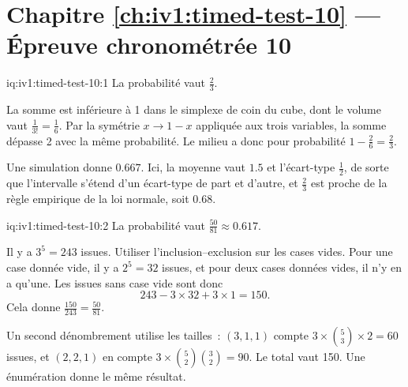 \section*{Chapitre \ref{ch:iv1:timed-test-10} --- Épreuve chronométrée 10}

\begin{solution}{iq:iv1:timed-test-10:1}
La probabilité vaut $\frac23$.

La somme est inférieure à 1 dans le simplexe de coin du cube, dont le volume vaut $\frac{1}{3!} = \frac16$. Par la symétrie $x \to 1 - x$ appliquée aux trois variables, la somme dépasse 2 avec la même probabilité. Le milieu a donc pour probabilité $1 - \frac26 = \frac23$.

Une simulation donne $0.667$. Ici, la moyenne vaut $1.5$ et l'écart-type $\frac12$, de sorte que l'intervalle s'étend d'un écart-type de part et d'autre, et $\frac23$ est proche de la règle empirique de la loi normale, soit $0.68$.

\end{solution}

\begin{solution}{iq:iv1:timed-test-10:2}
La probabilité vaut $\frac{50}{81} \approx 0.617$.

Il y a $3^5 = 243$ issues. Utiliser l'inclusion--exclusion sur les cases vides. Pour une case donnée vide, il y a $2^5 = 32$ issues, et pour deux cases données vides, il n'y en a qu'une. Les issues sans case vide sont donc
\[
243 - 3 \times 32 + 3 \times 1 = 150.
\]
Cela donne $\frac{150}{243} = \frac{50}{81}$.

Un second dénombrement utilise les tailles~: $(3, 1, 1)$ compte $3 \times \binom53 \times 2 = 60$ issues, et $(2, 2, 1)$ en compte $3 \times \binom52\binom32 = 90$. Le total vaut 150. Une énumération donne le même résultat.

\end{solution}


